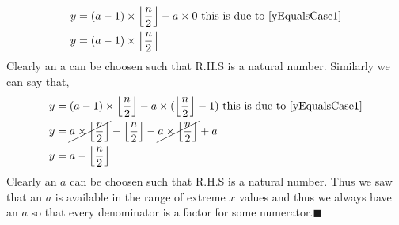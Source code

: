 \documentclass[10pt, twoside]{article}
\newcommand{\floordivision}[2]{\left\lfloor \frac{#1}{#2} \right\rfloor}
\begin{document}
\begin{align*}
	y &= (a-1)\times \floordivision{n}{2} - a\times 0 \text{ this is due to \eqref{yEqualsCase1}} \\
	y &= (a-1)\times \floordivision{n}{2}
\end{align*}
Clearly an a can be choosen such that R.H.S is a natural number. Similarly we can say that,
\begin{align*}
	y &= (a-1)\times \floordivision{n}{2} - a\times (\floordivision{n}{2}-1) \text{ this is due to \eqref{yEqualsCase1}} \\
	y &= \cancel{a\times \floordivision{n}{2}} - \floordivision{n}{2} -\cancel{a\times \floordivision{n}{2}} +a \\	
	y &= a - \floordivision{n}{2}
\end{align*}
Clearly an \textbf{$a$} can be choosen such that R.H.S is a natural number. Thus we saw that an $a$ is available in the range of extreme $x$ values and thus we always have an \textbf{$a$} so that every denominator is a factor for some numerator.$\blacksquare$
\end{document}
